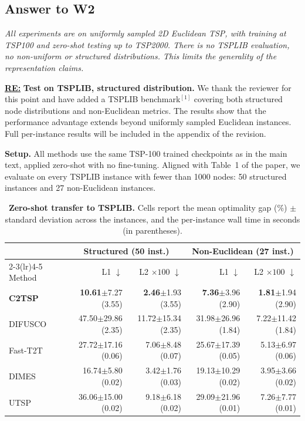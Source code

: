 \subsection{Answer to W2}

\textit{All experiments are on uniformly sampled 2D Euclidean TSP, with training at TSP100 and zero-shot testing up to TSP2000. There is no TSPLIB evaluation, no non-uniform or structured distributions. This limits the generality of the representation claims.}

\textbf{\underline{RE:}}
\textbf{Test on TSPLIB, structured distribution.}
We thank the reviewer for this point and have added a TSPLIB benchmark$^{[1]}$ covering both structured node distributions and non-Euclidean metrics. The results show that the performance advantage extends beyond uniformly sampled Euclidean instances. Full per-instance results will be included in the appendix of the revision.

\textbf{Setup.} All methods use the same TSP-100 trained checkpoints as in the main text, applied zero-shot with no fine-tuning. Aligned with Table~1 of the paper, we evaluate on every TSPLIB instance with fewer than 1000 nodes: 50 structured instances and 27 non-Euclidean instances.

\begin{table}[h]
\centering
\caption{\textbf{Zero-shot transfer to TSPLIB.} Cells report the mean optimality gap (\%) $\pm$ standard deviation across the instances, and the per-instance wall time in seconds (in parentheses).}
\label{tab:tsplib-core}
\small
\setlength{\tabcolsep}{4pt}
\begin{tabular}{lrrrr}
\toprule
 & \multicolumn{2}{c}{Structured (50 inst.)} & \multicolumn{2}{c}{Non-Euclidean (27 inst.)} \\
\cmidrule(lr){2-3}\cmidrule(lr){4-5}
Method & L1 $\downarrow$ & L2 $\times 100$ $\downarrow$ & L1 $\downarrow$ & L2 $\times 100$ $\downarrow$ \\
\midrule
\textbf{C2TSP} & \textbf{10.61}$\pm$7.27 (3.55) & \textbf{2.46}$\pm$1.93 (3.55) & \textbf{7.36}$\pm$3.96 (2.90) & \textbf{1.81}$\pm$1.94 (2.90) \\
DIFUSCO & 47.50$\pm$29.86 (2.35) & 11.72$\pm$15.34 (2.35) & 31.98$\pm$26.96 (1.84) & 7.22$\pm$11.42 (1.84) \\
Fast-T2T & 27.72$\pm$17.16 (0.06) & 7.06$\pm$8.48 (0.07) & 25.67$\pm$17.39 (0.05) & 5.13$\pm$6.97 (0.06) \\
DIMES & 16.74$\pm$5.80 (0.02) & 3.42$\pm$1.76 (0.03) & 19.13$\pm$10.29 (0.02) & 3.95$\pm$3.66 (0.02) \\
UTSP & 36.06$\pm$15.00 (0.02) & 9.18$\pm$6.18 (0.02) & 29.09$\pm$21.96 (0.01) & 7.26$\pm$7.77 (0.01) \\
\bottomrule
\end{tabular}
\end{table}

